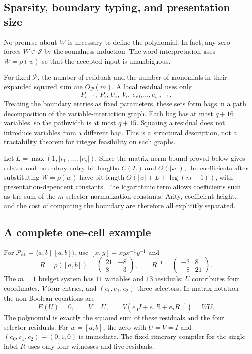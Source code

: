 \documentclass[11pt,letterpaper]{article}
\theoremstyle{definition}
\theoremstyle{remark}
\newcommand{\Pp}{\mathcal P}
\newcommand{\San}{\mathcal S}
\newcommand{\smallmat}[4]{\begin{pmatrix}#1&#2\\#3&#4\end{pmatrix}}
\begin{document}
\subsection{Sparsity, boundary typing, and presentation size}

No promise about $W$ is necessary to define the polynomial. In fact, any zero forces $W\in\San$ by the soundness induction. The word interpretation uses $W=\rho(w)$ so that the accepted input is unambiguous.

For fixed $\Pp$, the number of residuals and the number of monomials in their expanded squared sum are $O_{\Pp}(m)$. A local residual uses only
\[
 P_{i-1},\ P_i,\ U_i,\ V_i,\ e_{i0},\ldots,e_{i,q-1}.
\]
Treating the boundary entries as fixed parameters, these sets form bags in a path decomposition of the variable-interaction graph. Each bag has at most $q+16$ variables, so the pathwidth is at most $q+15$. Squaring a residual does not introduce variables from a different bag. This is a structural description, not a tractability theorem for integer feasibility on such graphs.

Let $L=\max(1,|r_1|,\ldots,|r_s|)$. Since the matrix norm bound proved below gives relator and boundary entry bit lengths $O(L)$ and $O(|w|)$, the coefficients after substituting $W=\rho(w)$ have bit length
$O(|w|+L+\log(m+1))$, with presentation-dependent constants. The logarithmic term allows coefficients such as the sum of the $m$ selector-normalization constants. Arity, coefficient height, and the cost of computing the boundary are therefore all explicitly separated.

\subsection{A complete one-cell example}

For $\Pp_{\mathrm{ab}}=\langle a,b\mid[a,b]\rangle$, use
$[x,y]=xyx^{-1}y^{-1}$ and
\begin{equation}\label{gts:vk:eq:commutator-matrix}
 R=\rho([a,b])=\smallmat{21}{-8}{8}{-3},\qquad
 R^{-1}=\smallmat{-3}{8}{-8}{21}.
\end{equation}
The $m=1$ budget system has $11$ variables and $13$ residuals:
$U$ contributes four coordinates, $V$ four entries, and $(e_0,e_1,e_2)$ three selectors. In matrix notation the non-Boolean equations are
\[
 E(U)=0,\qquad V=U,\qquad
 V(e_0I+e_1R+e_2R^{-1})=WU.
\]
The polynomial is exactly the squared sum of these residuals and the four selector residuals. For $w=[a,b]$, the zero with $U=V=I$ and $(e_0,e_1,e_2)=(0,1,0)$ is immediate. The fixed-itinerary compiler for the single label $R$ uses only four witnesses and five residuals.
\end{document}
